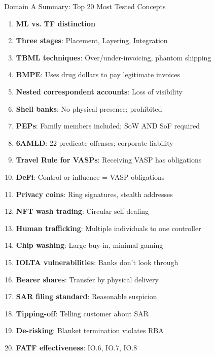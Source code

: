 \documentclass{beamer}
\begin{document}

\begin{frame}{Domain A Summary: Top 20 Most Tested Concepts}
	\begin{enumerate}
		\item \textbf{ML vs. TF distinction}
		\item \textbf{Three stages}: Placement, Layering, Integration
		\item \textbf{TBML techniques}: Over/under-invoicing, phantom shipping
		\item \textbf{BMPE}: Uses drug dollars to pay legitimate invoices
		\item \textbf{Nested correspondent accounts}: Loss of visibility
		\item \textbf{Shell banks}: No physical presence; prohibited
		\item \textbf{PEPs}: Family members included; SoW AND SoF required
		\item \textbf{6AMLD}: 22 predicate offenses; corporate liability
		\item \textbf{Travel Rule for VASPs}: Receiving VASP has obligations
		\item \textbf{DeFi}: Control or influence = VASP obligations
		\item \textbf{Privacy coins}: Ring signatures, stealth addresses
		\item \textbf{NFT wash trading}: Circular self-dealing
		\item \textbf{Human trafficking}: Multiple individuals to one controller
		\item \textbf{Chip washing}: Large buy-in, minimal gaming
		\item \textbf{IOLTA vulnerabilities}: Banks don't look through
		\item \textbf{Bearer shares}: Transfer by physical delivery
		\item \textbf{SAR filing standard}: Reasonable suspicion
		\item \textbf{Tipping-off}: Telling customer about SAR
		\item \textbf{De-risking}: Blanket termination violates RBA
		\item \textbf{FATF effectiveness}: IO.6, IO.7, IO.8
	\end{enumerate}
\end{frame}
\end{document}
